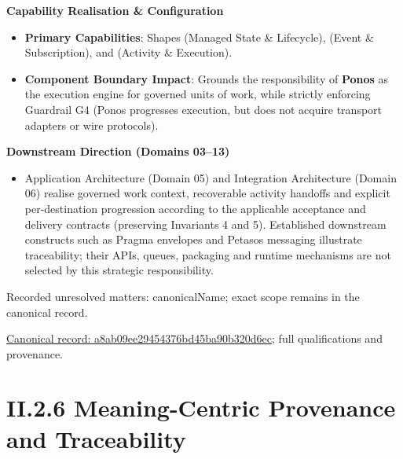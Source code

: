 \par\medskip\textbf{Capability Realisation \& Configuration}\par


\begin{itemize}


\item \textbf{Primary Capabilities}: Shapes \texttt{} (Managed State \& Lifecycle), \texttt{} (Event \& Subscription), and \texttt{} (Activity \& Execution).

\item \textbf{Component Boundary Impact}: Grounds the responsibility of \textbf{Ponos} as the execution engine for governed units of work, while strictly enforcing Guardrail G4 (Ponos progresses execution, but does not acquire transport adapters or wire protocols).

\end{itemize}


\par\medskip\textbf{Downstream Direction (Domains 03–13)}\par


\begin{itemize}


\item Application Architecture (Domain 05) and Integration Architecture (Domain 06) realise governed work context, recoverable activity handoffs and explicit per-destination progression according to the applicable acceptance and delivery contracts (preserving Invariants 4 and 5). Established downstream constructs such as Pragma envelopes and Petasos messaging illustrate traceability; their APIs, queues, packaging and runtime mechanisms are not selected by this strategic responsibility.

\end{itemize}

{\small Recorded unresolved matters: canonicalName; exact scope remains in the canonical record.}\par
{\footnotesize \href{../../../../continuum/strategy/course-of-action/a8ab09ee29454376bd45ba90b320d6ec.md}{Canonical record: a8ab09ee29454376bd45ba90b320d6ec}; full qualifications and provenance.}\par
\section*{II.2.6 Meaning-Centric Provenance and Traceability}
\label{navigation:II.2.6}

